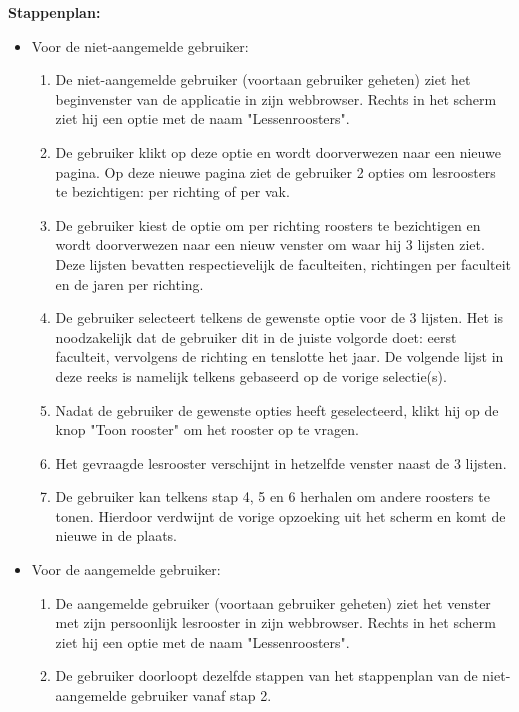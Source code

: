 \textbf{Stappenplan:}
\begin{itemize}
\item Voor de niet-aangemelde gebruiker: 
	\begin{enumerate}
		\item De niet-aangemelde gebruiker (voortaan gebruiker geheten) ziet het beginvenster van de applicatie in zijn webbrowser. Rechts in het scherm ziet hij een optie met de naam "Lessenroosters".
		\item De gebruiker klikt op deze optie en wordt doorverwezen naar een nieuwe pagina. Op deze nieuwe pagina ziet de gebruiker 2 opties om lesroosters te bezichtigen: per richting of per vak.
		\item De gebruiker kiest de optie om per richting roosters te bezichtigen en wordt doorverwezen naar een nieuw venster om waar hij 3 lijsten ziet. Deze lijsten bevatten respectievelijk de faculteiten, richtingen per faculteit en de jaren per richting.
		\item De gebruiker selecteert telkens de gewenste optie voor de 3 lijsten. Het is noodzakelijk dat de gebruiker dit in de juiste volgorde doet: eerst faculteit, vervolgens de richting en tenslotte het jaar. De volgende lijst in deze reeks is namelijk telkens gebaseerd op de vorige selectie(s).
		\item Nadat de gebruiker de gewenste opties heeft geselecteerd, klikt hij op de knop "Toon rooster" om het rooster op te vragen.
		\item Het gevraagde lesrooster verschijnt in hetzelfde venster naast de 3 lijsten.
		\item De gebruiker kan telkens stap 4, 5 en 6 herhalen om andere roosters te tonen. Hierdoor verdwijnt de vorige opzoeking uit het scherm en komt de nieuwe in de plaats.
	\end{enumerate}
\item Voor de aangemelde gebruiker:
	\begin{enumerate}
	\item De aangemelde gebruiker (voortaan gebruiker geheten) ziet het venster met zijn persoonlijk lesrooster in zijn webbrowser. Rechts in het scherm ziet hij een optie met de naam "Lessenroosters".
	\item De gebruiker doorloopt dezelfde stappen van het stappenplan van de niet-aangemelde gebruiker vanaf stap 2.
	\end{enumerate}
\end{itemize}

